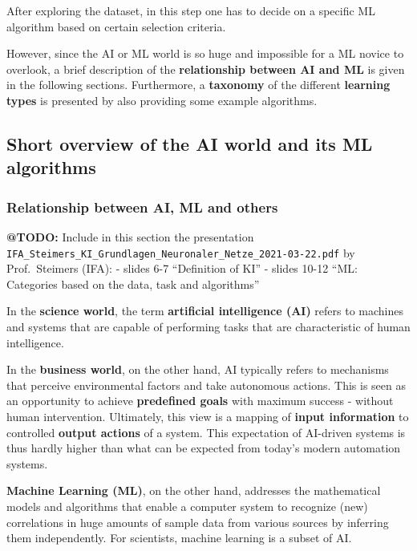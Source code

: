 \documentclass [oneside,10pt,a4paper,ngerman,BCOR10mm,headsepline,parindent,final]{scrartcl}
\begin{document}
After exploring the dataset, in this step one has to decide on a
specific ML algorithm based on certain selection criteria.

However, since the AI or ML world is so huge and impossible for a ML
novice to overlook, a brief description of the \textbf{relationship
between AI and ML} is given in the following sections. Furthermore, a
\textbf{taxonomy} of the different \textbf{learning types} is presented
by also providing some example algorithms.

\hypertarget{short-overview-of-the-ai-world-and-its-ml-algorithms}{%
\subsection{Short overview of the AI world and its ML
algorithms}\label{short-overview-of-the-ai-world-and-its-ml-algorithms}}

\hypertarget{relationship-between-ai-ml-and-others}{%
\subsubsection{Relationship between AI, ML and
others}\label{relationship-between-ai-ml-and-others}}

\textbf{@TODO:} Include in this section the presentation
\texttt{IFA\_Steimers\_KI\_Grundlagen\_Neuronaler\_Netze\_2021-03-22.pdf}
by Prof.~Steimers (IFA): - slides 6-7 ``Definition of KI'' - slides
10-12 ``ML: Categories based on the data, task and algorithms''

In the \textbf{science world}, the term \textbf{artificial intelligence
(AI)} refers to machines and systems that are capable of performing
tasks that are characteristic of human intelligence.

In the \textbf{business world}, on the other hand, AI typically refers
to mechanisms that perceive environmental factors and take autonomous
actions. This is seen as an opportunity to achieve \textbf{predefined
goals} with maximum success - without human intervention. Ultimately,
this view is a mapping of \textbf{input information} to controlled
\textbf{output actions} of a system. This expectation of AI-driven
systems is thus hardly higher than what can be expected from today's
modern automation systems.

\textbf{Machine Learning (ML)}, on the other hand, addresses the
mathematical models and algorithms that enable a computer system to
recognize (new) correlations in huge amounts of sample data from various
sources by inferring them independently. For scientists, machine
learning is a subset of AI.
\end{document}
